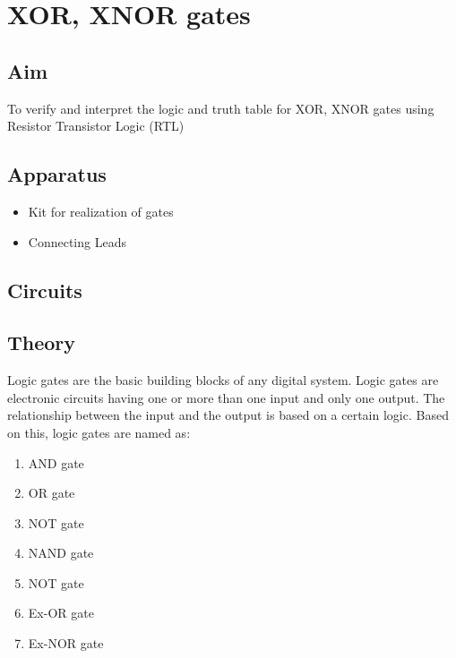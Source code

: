 \chapter{XOR, XNOR gates}

\section{Aim}
	To verify and interpret the logic and truth table for XOR, XNOR gates using Resistor Transistor Logic (RTL)

\section{Apparatus}
	\begin{itemize}
		\tightlist
		\item Kit for realization of gates
		\item Connecting Leads
	\end{itemize}

\section{Circuits}
	

\section{Theory}
	Logic gates are the basic building blocks of any digital system. Logic gates are electronic circuits having one or more than one input and only one output. The relationship between the input and the output is based on a certain logic. Based on this, logic gates are named as:
	\begin{enumerate}
		\tightlist
		\item AND gate
		\item OR gate
		\item NOT gate
		\item NAND gate
		\item NOT gate
		\item Ex-OR gate
		\item Ex-NOR gate
	\end{enumerate}
	
